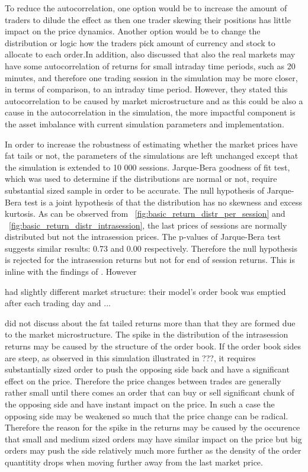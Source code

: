 To reduce the autocorrelation, one option would be to increase the amount of traders to dilude the effect as then
one trader skewing their positions has little impact on the price dynamics. Another option would be to change the 
distribution or logic how the traders pick amount of currency and stock to allocate to each order.In addition, 
\citet{StylizedFacts01} also discussed that also the real markets may have some autocorrelation 
of returns for small intraday time periods, such as 20 minutes, and therefore one trading session in the simulation 
may be more closer, in terms of comparison, to an intraday time period. However, they stated this autocorrelation
to be caused by market microstructure and as this could be also a cause in the autocorrelation in the simulation,
the more impactful component is the asset imbalance with current simulation parameters and implementation.


In order to increase the robustness of estimating whether the market prices have fat tails or not, the parameters of the
simulations are left unchanged except that the simulation is extended to 10 000 sessions. Jarque-Bera goodness of fit test,
which was used to determine if the distributions are normal or not, require substantial sized sample in order to be accurate.
The null hypothesis of Jarque-Bera test is a joint hypothesis of that the distribution has no skewness and excess kurtosis. 
As can be observed from ~\ref{fig:basic_return_distr_per_session} and ~\ref{fig:basic_return_distr_intrasession}, the last 
prices of sessions are normally distributed but not the intrasession prices. The p-values of Jarque-Bera test suggests similar
results: 0.73 and 0.00 respectively. Therefore the null hypothesis is rejected for the intrasession returns but not for
end of session returns. This is inline with the findings of \citet{Raberto05}. However \author{Raberto05} had slightly
different market structure: their model's order book was emptied after each trading day and ...
\author{Raberto05} did not discuss about the fat tailed returns more than that they are formed due to the market microstructure.
The spike in the distribution of the intrasession returns may be caused by the structure of the order book. If the order book 
sides are steep, as observed in this simulation illustrated in ???, it requires substantially sized order to push the opposing 
side back and have a significant effect on the price. Therefore the price changes between trades are generally rather small
until there comes an order that can buy or sell significant chunk of the opposing side and have instant impact on the price. 
In such a case the opposing side may be weakened so much that the price change can be radical. Therefore the reason for the
spike in the returns may be caused by the occurence that small and medium sized orders may have similar impact on the price
but big orders may push the side relatively much more further as the density of the order quantitity drops when moving further
away from the last market price.


